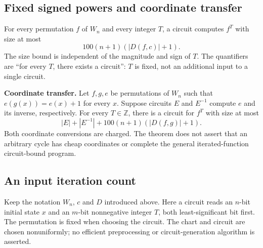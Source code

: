 \begin{result}
\subsection{Fixed signed powers and coordinate transfer}
For every permutation $f$ of $W_n$ and every integer $T$, a circuit computes $f^T$
with size at most
\[
100(n+1)(|D(f,c)|+1).
\]
The size bound is independent of the magnitude and sign of $T$. The quantifiers
are ``for every $T$, there exists a circuit'': $T$ is fixed, not an additional
input to a single circuit.

\end{result}

\begin{result}
\textbf{Coordinate transfer.}
Let $f,g,e$ be permutations of $W_n$ such that $e(g(x))=e(x)+1$ for every $x$.
Suppose circuits $E$ and $E^{-1}$ compute $e$ and its inverse, respectively.
For every $T\in\mathbb Z$, there is a circuit for $f^T$ with size at most
\[
|E|+|E^{-1}|+100(n+1)(|D(f,g)|+1).
\]
Both coordinate conversions are charged. The theorem does not assert that an
arbitrary cycle has cheap coordinates or complete the general iterated-function
circuit-bound program.
\end{result}

\begin{result}
\subsection*{An input iteration count}
Keep the notation $W_n$, $c$ and $D$ introduced above. Here a circuit
reads an $n$-bit initial state $x$ and an $m$-bit nonnegative integer $T$, both
least-significant bit first. The permutation is fixed when choosing the circuit.
The chart and circuit are chosen nonuniformly; no efficient preprocessing or
circuit-generation algorithm is asserted.\citep{Schlesinger2026IteratedFunctions}
\end{result}


